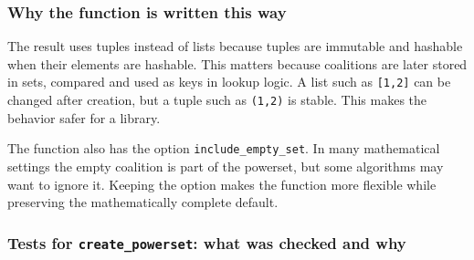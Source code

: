 \documentclass[11pt]{article}
\begin{document}
\subsubsection*{Why the function is written this way}

The result uses tuples instead of lists because tuples are immutable and
hashable when their elements are hashable. This matters because coalitions are
later stored in sets, compared and used as keys in lookup logic. A list such
as \texttt{[1,2]} can be changed after creation, but a tuple such as
\texttt{(1,2)} is stable. This makes the behavior safer for a library.

The function also has the option \texttt{include\_empty\_set}. In many
mathematical settings the empty coalition is part of the powerset, but some
algorithms may want to ignore it. Keeping the option makes the function more
flexible while preserving the mathematically complete default.

\subsubsection*{Tests for \texttt{create\_powerset}: what was checked and why}
\end{document}
